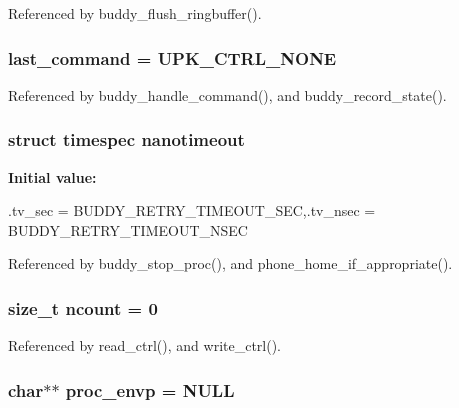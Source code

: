 Referenced by buddy\_\-flush\_\-ringbuffer().

\subsubsection[{last\_\-command}]{ {\bf last\_\-command} = UPK\_\-CTRL\_\-NONE\hspace{0.3cm}{\ttfamily  [static]}}\label{buddy_8c_afac02348ed45a2ad675379a8ca104518}


Referenced by buddy\_\-handle\_\-command(), and buddy\_\-record\_\-state().

\subsubsection[{nanotimeout}]{\setlength{\rightskip}{0pt plus 5cm}struct timespec {\bf nanotimeout}\hspace{0.3cm}{\ttfamily  [static]}}\label{buddy_8c_a0aa2ef11dabd8b068b1725e8a94c92cb}
{\bfseries Initial value:}
\begin{DoxyCode}
 {.tv_sec = BUDDY_RETRY_TIMEOUT_SEC,.tv_nsec =
        BUDDY_RETRY_TIMEOUT_NSEC }
\end{DoxyCode}


Referenced by buddy\_\-stop\_\-proc(), and phone\_\-home\_\-if\_\-appropriate().

\subsubsection[{ncount}]{\setlength{\rightskip}{0pt plus 5cm}size\_\-t {\bf ncount} = 0\hspace{0.3cm}{\ttfamily  [static]}}\label{buddy_8c_af750bbadf6e7e222f8d8b062e8696dd0}


Referenced by read\_\-ctrl(), and write\_\-ctrl().

\subsubsection[{proc\_\-envp}]{\setlength{\rightskip}{0pt plus 5cm}char$\ast$$\ast$ {\bf proc\_\-envp} = NULL}\label{buddy_8c_adcfeefdfcc71ba2dc2cddac18f4dcb4d}


